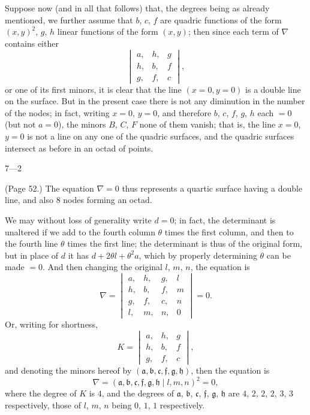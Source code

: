 \documentclass[11pt,a4paper]{article}
\begin{document}
Suppose now (and in all that follows) that, the degrees being as already mentioned, we further assume that $b$, $c$, $f$ are quadric functions of the form $(x, y)^2$, $g$, $h$ linear functions of the form $(x, y)$; then since each term of $\nabla$ contains either
\[
\begin{vmatrix} a, & h, & g \\ h, & b, & f \\ g, & f, & c \end{vmatrix},
\]
or one of its first minors, it is clear that the line $(x = 0, y = 0)$ is a double line on the surface. But in the present case there is not any diminution in the number of the nodes; in fact, writing $x = 0$, $y = 0$, and therefore $b$, $c$, $f$, $g$, $h$ each $= 0$ (but not $a = 0$), the minors $B$, $C$, $F$ none of them vanish; that is, the line $x = 0$, $y = 0$ is not a line on any one of the quadric surfaces, and the quadric surfaces intersect as before in an octad of points.

\hfill 7---2

\bigskip

\noindent (Page 52.) The equation $\nabla = 0$ thus represents a quartic surface having a double line, and also $8$ nodes forming an octad.

We may without loss of generality write $d = 0$; in fact, the determinant is unaltered if we add to the fourth column $\theta$ times the first column, and then to the fourth line $\theta$ times the first line; the determinant is thus of the original form, but in place of $d$ it has $d + 2\theta l + \theta^2 a$, which by properly determining $\theta$ can be made $= 0$. And then changing the original $l$, $m$, $n$, the equation is
\[
\nabla = \begin{vmatrix} a, & h, & g, & l \\ h, & b, & f, & m \\ g, & f, & c, & n \\ l, & m, & n, & 0 \end{vmatrix} = 0.
\]
Or, writing for shortness,
\[
K = \begin{vmatrix} a, & h, & g \\ h, & b, & f \\ g, & f, & c \end{vmatrix},
\]
and denoting the minors hereof by $(\mathfrak{a}, \mathfrak{b}, \mathfrak{c}, \mathfrak{f}, \mathfrak{g}, \mathfrak{h})$, then the equation is
\[
\nabla = (\mathfrak{a}, \mathfrak{b}, \mathfrak{c}, \mathfrak{f}, \mathfrak{g}, \mathfrak{h} \mid l, m, n)^2 = 0,
\]
where the degree of $K$ is $4$, and the degrees of $\mathfrak{a}$, $\mathfrak{b}$, $\mathfrak{c}$, $\mathfrak{f}$, $\mathfrak{g}$, $\mathfrak{h}$ are $4$, $2$, $2$, $2$, $3$, $3$ respectively, those of $l$, $m$, $n$ being $0$, $1$, $1$ respectively.
\end{document}
